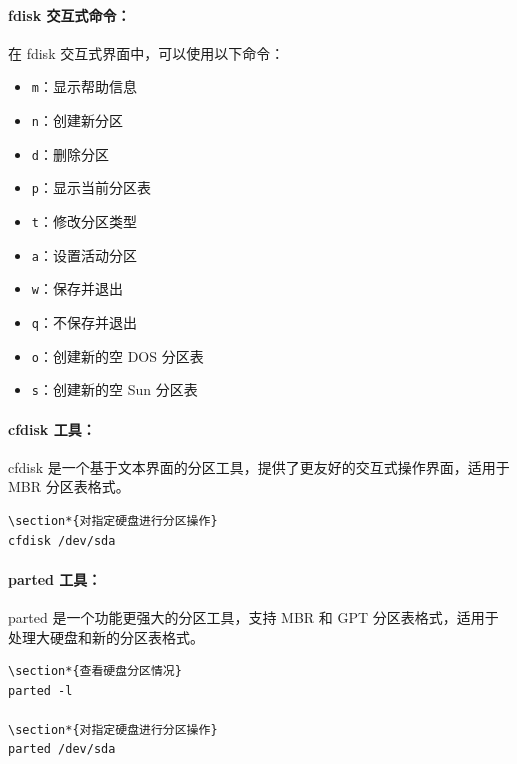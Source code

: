 \documentclass[12pt,UTF8]{ctexbook}
\begin{document}
\paragraph{fdisk 交互式命令：}
在 fdisk 交互式界面中，可以使用以下命令：
\begin{itemize}
    \item \verb+m+：显示帮助信息
    \item \verb+n+：创建新分区
    \item \verb+d+：删除分区
    \item \verb+p+：显示当前分区表
    \item \verb+t+：修改分区类型
    \item \verb+a+：设置活动分区
    \item \verb+w+：保存并退出
    \item \verb+q+：不保存并退出
    \item \verb+o+：创建新的空 DOS 分区表
    \item \verb+s+：创建新的空 Sun 分区表
\end{itemize}

\paragraph{cfdisk 工具：}
cfdisk 是一个基于文本界面的分区工具，提供了更友好的交互式操作界面，适用于 MBR 分区表格式。
\begin{verbatim}
\section*{对指定硬盘进行分区操作}
cfdisk /dev/sda
\end{verbatim}

\paragraph{parted 工具：}
parted 是一个功能更强大的分区工具，支持 MBR 和 GPT 分区表格式，适用于处理大硬盘和新的分区表格式。
\begin{verbatim}
\section*{查看硬盘分区情况}
parted -l

\section*{对指定硬盘进行分区操作}
parted /dev/sda
\end{verbatim}
\end{document}
